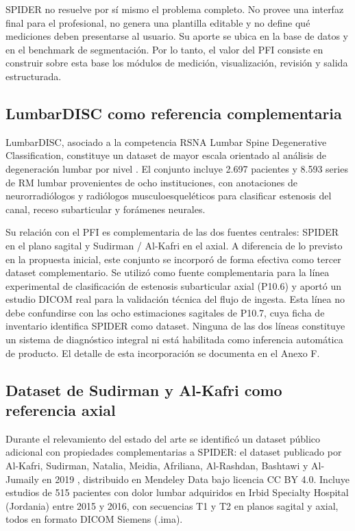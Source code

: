 SPIDER no resuelve por sí mismo el problema completo. No provee una interfaz final para el profesional, no genera una plantilla editable y no define qué mediciones deben presentarse al usuario. Su aporte se ubica en la base de datos y en el benchmark de segmentación. Por lo tanto, el valor del PFI consiste en construir sobre esta base los módulos de medición, visualización, revisión y salida estructurada.

\subsection{LumbarDISC como referencia complementaria}

LumbarDISC, asociado a la competencia RSNA Lumbar Spine Degenerative Classification, constituye un dataset de mayor escala orientado al análisis de degeneración lumbar por nivel \parencite{richards_lumbardisc_2026}. El conjunto incluye 2.697 pacientes y 8.593 series de RM lumbar provenientes de ocho instituciones, con anotaciones de neurorradiólogos y radiólogos musculoesqueléticos para clasificar estenosis del canal, receso subarticular y forámenes neurales.

Su relación con el PFI es complementaria de las dos fuentes centrales: SPIDER en el plano sagital y Sudirman / Al-Kafri en el axial. A diferencia de lo previsto en la propuesta inicial, este conjunto se incorporó de forma efectiva como tercer dataset complementario. Se utilizó como fuente complementaria para la línea experimental de clasificación de estenosis subarticular axial (P10.6) y aportó un estudio DICOM real para la validación técnica del flujo de ingesta. Esta línea no debe confundirse con las ocho estimaciones sagitales de P10.7, cuya ficha de inventario identifica SPIDER como dataset. Ninguna de las dos líneas constituye un sistema de diagnóstico integral ni está habilitada como inferencia automática de producto. El detalle de esta incorporación se documenta en el Anexo F.

\subsection{Dataset de Sudirman y Al-Kafri como referencia axial}
\label{sec:estado-arte-dataset-sudirman}

Durante el relevamiento del estado del arte se identificó un dataset público adicional con propiedades complementarias a SPIDER: el dataset publicado por Al-Kafri, Sudirman, Natalia, Meidia, Afriliana, Al-Rashdan, Bashtawi y Al-Jumaily en 2019 \parencite{alkafri_sudirman_boundary_2019}, distribuido en Mendeley Data bajo licencia CC BY 4.0. Incluye estudios de 515 pacientes con dolor lumbar adquiridos en Irbid Specialty Hospital (Jordania) entre 2015 y 2016, con secuencias T1 y T2 en planos sagital y axial, todos en formato DICOM Siemens (.ima).

